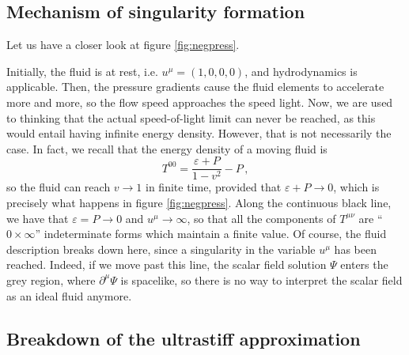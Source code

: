 \documentclass[a4paper, amsfonts, amssymb, amsmath, reprint, showkeys, nofootinbib, twoside,notitlepage,onecolumn]{revtex4-2}
\theoremstyle{definition}
\theoremstyle{theorem}
\theoremstyle{corollary}
\begin{document}
\subsection{Mechanism of singularity formation}\label{singulone}

Let us have a closer look at figure \ref{fig:negpress}. 

Initially, the fluid is at rest, i.e. $u^\mu=(1,0,0,0)$, and hydrodynamics is applicable. Then, the pressure gradients cause the fluid elements to accelerate more and more, so the flow speed approaches the speed light. Now, we are used to thinking that the actual speed-of-light limit can never be reached, as this would entail having infinite energy density. However, that is not necessarily the case. In fact, we recall that the energy density of a moving fluid is
\begin{equation}
T^{00}=\dfrac{\varepsilon+P}{1-v^2} -P\, ,
\end{equation}
so the fluid can reach  $v\rightarrow 1$ in finite time, provided that $\varepsilon+P\rightarrow 0$, which is precisely what happens in figure \ref{fig:negpress}. Along the continuous black line, we have that $\varepsilon=P \rightarrow 0$ and $u^\mu \rightarrow \infty$, so that all the components of $T^{\mu \nu}$ are ``$0 \times \infty$'' indeterminate forms which maintain a finite value. Of course, the fluid description breaks down here, since a singularity in the variable $u^\mu$ has been reached. Indeed, if we move past this line, the scalar field solution $\Psi$ enters the grey region, where $\partial^\mu \Psi$ is spacelike, so there is no way to interpret the scalar field as an ideal fluid anymore.

\subsection{Breakdown of the ultrastiff approximation}
\end{document}

